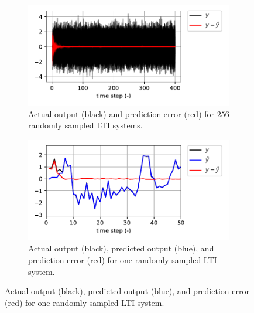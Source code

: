 \documentclass{article}
\begin{document}
\begin{figure}
    \centering
    \begin{subfigure}[t]{0.49\textwidth}
        \centering
        \includegraphics[width=\textwidth]{fig/lin_one_step_batch.pdf}
        \caption{
        Actual output (black) and prediction error (red) for $256$ randomly sampled LTI systems.}
        \label{fig:sim_one_step_batch}
    \end{subfigure}
    \hfill
    \begin{subfigure}[t]{0.49\textwidth}
        \centering
        \includegraphics[width=\textwidth]{fig/lin_one_step_single.pdf}
        \caption{Actual output (black), predicted output (blue), and prediction error (red) for one randomly sampled LTI system.}
        \label{fig:lin_one_step_single}
    \end{subfigure}


\end{figure}
\end{document}
